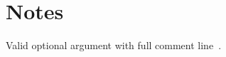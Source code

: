 \documentclass{article}
\begin{document}
\section{Notes}\label{sec:notes}
Valid optional argument with full comment line~\citep{k1}.


\end{document}
